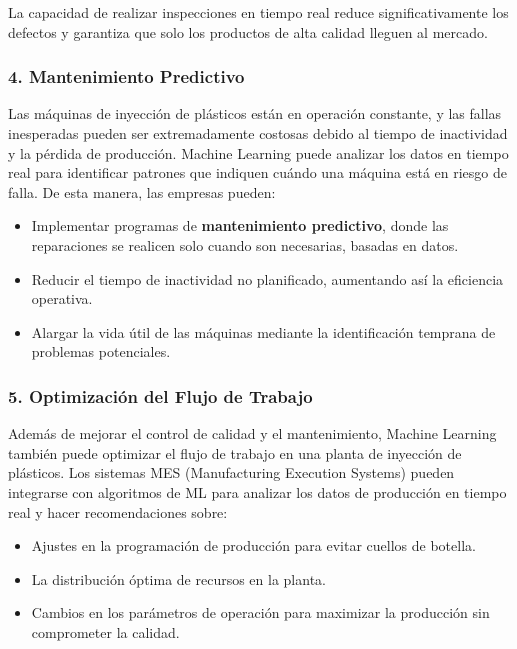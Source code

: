 La capacidad de realizar inspecciones en tiempo real reduce significativamente los defectos y garantiza que solo los productos de alta calidad lleguen al mercado.

\subsubsection{4. Mantenimiento Predictivo}

Las máquinas de inyección de plásticos están en operación constante, y las fallas inesperadas pueden ser extremadamente costosas debido al tiempo de inactividad y la pérdida de producción. Machine Learning puede analizar los datos en tiempo real para identificar patrones que indiquen cuándo una máquina está en riesgo de falla. De esta manera, las empresas pueden:

\begin{itemize}
    \item Implementar programas de \textbf{mantenimiento predictivo}, donde las reparaciones se realicen solo cuando son necesarias, basadas en datos.
    \item Reducir el tiempo de inactividad no planificado, aumentando así la eficiencia operativa.
    \item Alargar la vida útil de las máquinas mediante la identificación temprana de problemas potenciales.
\end{itemize}

\subsubsection{5. Optimización del Flujo de Trabajo}

Además de mejorar el control de calidad y el mantenimiento, Machine Learning también puede optimizar el flujo de trabajo en una planta de inyección de plásticos. Los sistemas MES (Manufacturing Execution Systems) pueden integrarse con algoritmos de ML para analizar los datos de producción en tiempo real y hacer recomendaciones sobre:

\begin{itemize}
    \item Ajustes en la programación de producción para evitar cuellos de botella.
    \item La distribución óptima de recursos en la planta.
    \item Cambios en los parámetros de operación para maximizar la producción sin comprometer la calidad.
\end{itemize}

